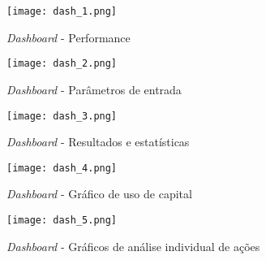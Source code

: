 \begin{figure}[!htb]
    \texttt{[image: dash\_1.png]}
    \centering
    \caption{\textit{Dashboard} - Performance}
    \label{fig:171}
\end{figure}

\begin{figure}[!htb]
    \texttt{[image: dash\_2.png]}
    \centering
    \caption{\textit{Dashboard} - Parâmetros de entrada}
    \label{fig:172}
\end{figure}

\begin{figure}[!htb]
    \texttt{[image: dash\_3.png]}
    \centering
    \caption{\textit{Dashboard} - Resultados e estatísticas}
    \label{fig:173}
\end{figure}

\begin{figure}[!htb]
    \texttt{[image: dash\_4.png]}
    \centering
    \caption{\textit{Dashboard} - Gráfico de uso de capital}
    \label{fig:174}
\end{figure}

\begin{figure}[!htb]
    \texttt{[image: dash\_5.png]}
    \centering
    \caption{\textit{Dashboard} - Gráficos de análise individual de ações }
    \label{fig:175}
\end{figure}











